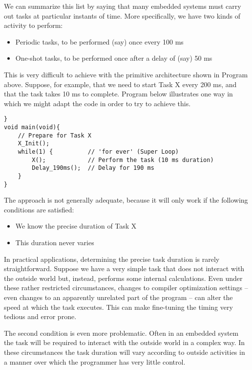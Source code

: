 We can summarize this list by saying that many embedded systems must carry
out tasks at particular instants of time. More specifically, we have two kinds of activity to perform:
\begin{itemize}
    \item Periodic tasks, to be performed (say) once every 100 ms
    \item One-shot tasks, to be performed once after a delay of (say) 50 ms  
\end{itemize}

This is very difficult to achieve with the primitive architecture shown in Program above. Suppose, for example, that we need to start Task X every 200 ms, and that the
task takes 10 ms to complete. Program below illustrates one way in which we might
adapt the code in order to try to achieve this.

\begin{lstlisting}[basicstyle=\small, caption= Trying to use the Super Loop architecture to execute tasks at regular intervals, label = {program_super_loop}]
}
void main(void){
    // Prepare for Task X
    X_Init();
    while(1) {          // 'for ever' (Super Loop)
        X();            // Perform the task (10 ms duration)
        Delay_190ms();  // Delay for 190 ms
    } 
}
\end{lstlisting}

The approach is not generally adequate, because it will only work if the following conditions are satisfied:
\begin{itemize}
    \item We know the precise duration of Task X
    \item This duration never varies
\end{itemize}

In practical applications, determining the precise task duration is rarely straightforward. Suppose we have a very simple task that does not interact with the outside
world but, instead, performs some internal calculations. Even under these rather
restricted circumstances, changes to compiler optimization settings – even changes to
an apparently unrelated part of the program – can alter the speed at which the task
executes. This can make fine-tuning the timing very tedious and error prone.

The second condition is even more problematic. Often in an embedded system the
task will be required to interact with the outside world in a complex way. In these circumstances the task duration will vary according to outside activities in a manner
over which the programmer has very little control.


